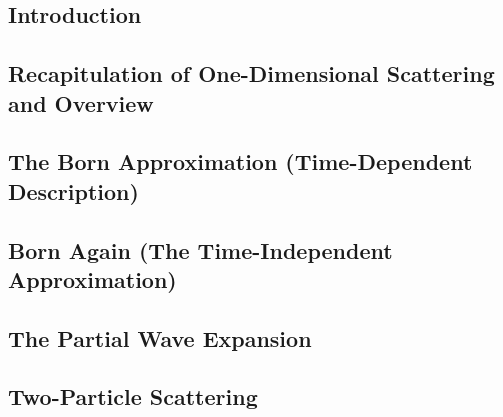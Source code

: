 \subsection{Introduction}

\subsection{Recapitulation of One-Dimensional Scattering and Overview}

\subsection{The Born Approximation (Time-Dependent Description)}

\subsection{Born Again (The Time-Independent Approximation)}

\subsection{The Partial Wave Expansion}

\subsection{Two-Particle Scattering}
